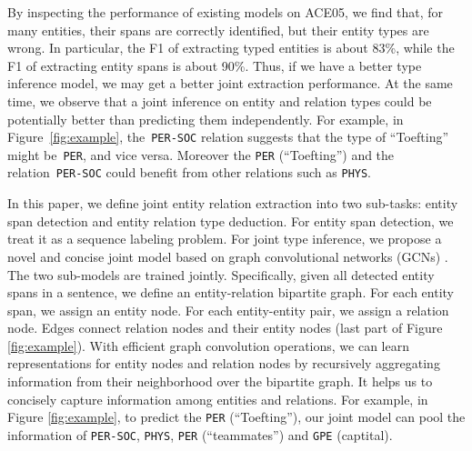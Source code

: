 By inspecting the performance of existing models \cite{D18-1249} on ACE05, 
we find that,
for many entities, their spans are correctly identified,
but their entity types are wrong.
In particular,
the F1 of extracting typed entities is about 83\%,
while the F1 of extracting entity spans is about 90\%.
Thus, if we have a better type inference model,
we may get a better joint extraction performance.
At the same time,
we observe that a joint inference on entity and relation types 
could be potentially better than predicting them independently.
For example, in Figure~\ref{fig:example},
the~\texttt{PER-SOC} relation suggests that the type of  ``Toefting'' might be~\texttt{PER}, and vice versa.
Moreover the \texttt{PER} (``Toefting'') and the relation~\texttt{PER-SOC} could
benefit from other relations such as \texttt{PHYS}.

In this paper,
we define joint entity relation extraction into two sub-tasks:
entity span detection and entity relation type deduction.
For entity span detection,
we treat it as a sequence labeling problem.
For joint type inference,
we propose a novel and concise joint model based on graph convolutional networks (GCNs) \cite{kipf2017semi}.
The two sub-models are trained jointly.
Specifically,
given all detected entity spans in a sentence,
we define an entity-relation bipartite graph.
For each entity span,
we assign an entity node.
For each entity-entity pair,
we assign a relation node.
Edges connect relation nodes and their entity nodes
(last part of Figure \ref{fig:example}).
With efficient graph convolution operations,
we can learn representations for entity nodes and relation nodes
by recursively aggregating information from their neighborhood
over the bipartite graph.
It helps us to concisely capture information among entities and relations.
For example, in Figure \ref{fig:example},
to predict the \texttt{PER} (``Toefting''),
our joint model can pool the information of \texttt{PER-SOC}, \texttt{PHYS},
\texttt{PER} (``teammates'') and \texttt{GPE} (captital).


